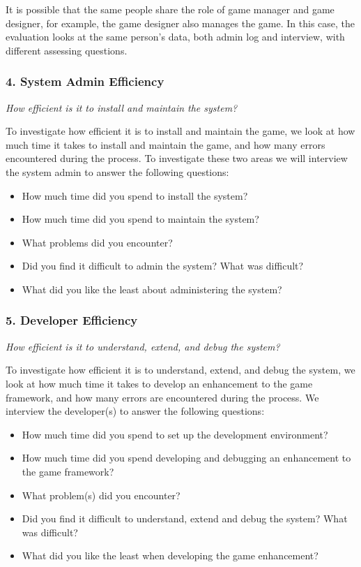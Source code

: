 \documentclass{sigchi}
\begin{document}
It is possible that the same people share the role of game manager and
game designer, for example, the game designer also manages the
game. In this case, the evaluation looks at the same person's
data, both admin log and interview, with different assessing
questions.

\subsubsection{4. System Admin Efficiency}

\emph{How efficient is it to install and maintain the system?}

To investigate how efficient it is to install and maintain
the game, we look at how much time it takes to install and
maintain the game, and how many errors encountered during the
process. To investigate these two areas we will interview the system
admin to answer the following questions:
\begin{itemize}
\item How much time did you spend to install the system?
\item How much time did you spend to maintain the system?
\item What problems did you encounter?
\item Did you find it difficult to admin the system? What was difficult?
\item What did you like the least about administering the system?
\end{itemize}

\subsubsection{5. Developer Efficiency}

\emph{How efficient is it to understand, extend, and debug the system?}

To investigate how efficient it is to understand, extend, and debug the
system, we look at how much time it takes to develop an
enhancement to the game framework, and how many errors are encountered
during the process. We interview the developer(s) to
answer the following questions:
\begin{itemize}
\item How much time did you spend to set up the development
  environment?
\item How much time did you spend developing and debugging an
  enhancement to the game framework?
\item What problem(s) did you encounter?
\item Did you find it difficult to understand, extend and debug the
  system? What was difficult?
\item What did you like the least when developing the game
  enhancement? 
\end{itemize}
\end{document}
